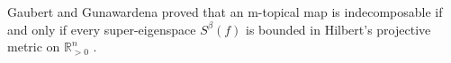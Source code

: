 \documentclass[10pt,reqno]{amsart}
\newcommand{\R}{\mathbb{R}}
\newcommand{\bs}{\setminus}
\theoremstyle{plain}
\newtheorem{proposition}[theorem]{Proposition}
\theoremstyle{definition}
\numberwithin{equation}{section}
\begin{document}
Gaubert and Gunawardena proved that an m-topical map is indecomposable if and only if every super-eigenspace $S^\beta(f)$ is bounded in Hilbert's projective metric on $\R^n_{>0}$ \cite[Theorem 5]{GaubertGunawardena04}. %

\end{document}
